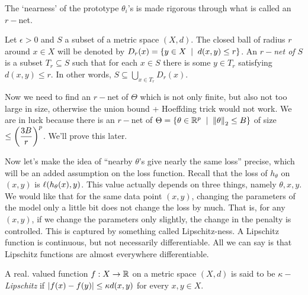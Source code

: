 The `nearness' of the prototype $\theta_{i}$'s is made rigorous through what is called an $r-$net.
\begin{defn}[$r-$net]
Let $\epsilon>0$ and $S$ a subset of a metric space $(X,d)$. The closed ball of radius $r$ around $x\in X$ will be denoted by $D_{r}(x) = \set{y\in X\st d(x,y)\le r}$. An \textit{$r-$net of $S$} is a subset $T_{r}\subseteq S$ such that for each $x\in S$ there is some $y\in T_{r}$ satisfying $d(x,y)\le r$. In other words, $S \subseteq \bigcup\limits_{x\in T_{r}}D_{r}(x)$.
\end{defn}

Now we need to find an $r-$net of $\Theta$ which is not only finite, but also not too large in size, otherwise the union bound + Hoeffding trick would not work. We are in luck because there is an $r-$net of $\Theta = \set{\theta\in\R^{p} \st \norm \theta2\le B}$ of size $\displaystyle\le\left(\frac{3B}{r}\right)^{p}$. We'll prove this later.

Now let's make the idea of ``nearby $\theta$'s give nearly the same loss'' precise, which will be an added assumption on the loss function. Recall that the loss of $h_{\theta}$ on $(x,y)$ is $\ell(h_{\theta}(x),y)$. This value actually depends on three things, namely $\theta,x,y$. We would like that for the same data point $(x,y)$, changing the parameters of the model only a little bit does not change the loss by much. That is, for any $(x,y)$, if we change the parameters only slightly, the change in the penalty is controlled. This is captured by something called Lipschitz-ness. A Lipschitz function is continuous, but not necessarily differentiable. All we can say is that Lipschitz functions are almost everywhere differentiable.
\begin{defn}
A real. valued function $f:X\to \mathbb{R}$ on a metric space $(X,d)$ is said to be \textit{$\kappa-$Lipschitz} if $\left| f(x) - f(y) \right| \le \kappa d(x,y)$ for every $x,y\in X$.
\end{defn}

